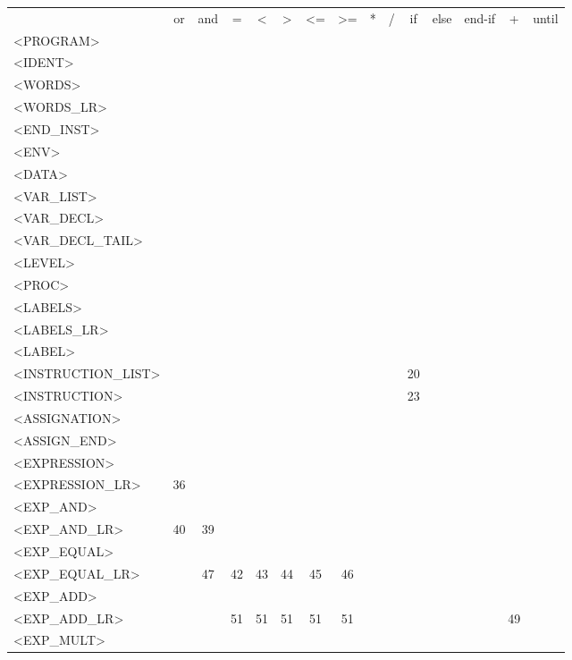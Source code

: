 \documentclass[a4paper,11pt]{article}
\begin{document}
\newpage
\begin{longtable}{l||cccccccccccccc}
	& or & and & = & < & > & <= & >= & * & / & if & else & end-if & + & until\\
	<PROGRAM> & & & & & & & & & & & & & & \\
	<IDENT> & & & & & & & & & & & & & & \\
	<WORDS>  & & & & & & & & & & & & & & \\
	<WORDS\_LR>  & & & & & & & & & & & & & & \\
	<END\_INST> & & & & & & & & & & & & & & \\
	<ENV> & & & & & & & & & & & & & & \\
	<DATA>  & & & & & & & & & & & & & & \\
	<VAR\_LIST> & & & & & & & & & & & & & & \\
	<VAR\_DECL>  & & & & & & & & & & & & & & \\
	<VAR\_DECL\_TAIL> & & & & & & & & & & & & & & \\
	<LEVEL> & & & & & & & & & & & & & & \\
	<PROC> & & & & & & & & & & & & & & \\
	<LABELS> & & & & & & & & & & & & & & \\
	<LABELS\_LR>  & & & & & & & & & & & & & & \\
	<LABEL>  & & & & & & & & & & & & & & \\
	<INSTRUCTION\_LIST> & & & & & & & & & & 20 & & & & \\
	<INSTRUCTION> & & & & & & & & & & 23 & & & & \\
	<ASSIGNATION> & & & & & & & & & & & & & & \\
	<ASSIGN\_END> & & & & & & & & & & & & & & \\
	<EXPRESSION>  & & & & & & & & & & & & & & \\
	<EXPRESSION\_LR> & 36 & & & & & & & & & & & & & \\
	<EXP\_AND>  & & & & & & & & & & & & &  &\\
	<EXP\_AND\_LR> & 40 & 39 & & & & & & & & & & & & \\
	<EXP\_EQUAL>  & & & & & & & & & & & & & & \\
	<EXP\_EQUAL\_LR> & & 47 & 42 & 43 & 44 & 45 & 46 & & & & & & & \\
	<EXP\_ADD>  & & & & & & & & & & & & & \\
	<EXP\_ADD\_LR> & & & 51 & 51 & 51 & 51 & 51 & & & & & & 49 & \\
	<EXP\_MULT>  & & & & & & & & & & & & & & \\

\end{longtable}
\end{document}
